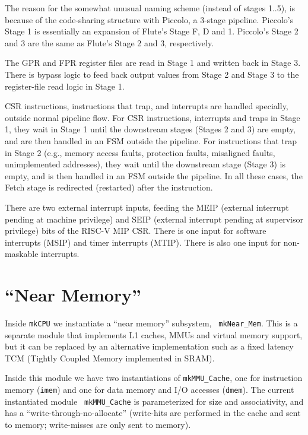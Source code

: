 \documentclass[11pt]{book}
\newcommand{\cf}{\footnotesize\tt}
\begin{document}
The reason for the somewhat unusual naming scheme (instead of stages
1..5), is because of the code-sharing structure with Piccolo, a
3-stage pipeline.  Piccolo's Stage 1 is essentially an expansion of
Flute's Stage F, D and 1.  Piccolo's Stage 2 and 3 are the same as
Flute's Stage 2 and 3, respectively.

The GPR and FPR register files are read in Stage 1 and written back in
Stage 3.  There is bypass logic to feed back output values from Stage
2 and Stage 3 to the register-file read logic in Stage 1.

CSR instructions, instructions that trap, and interrupts are handled
specially, outside normal pipeline flow.  For CSR instructions,
interrupts and traps in Stage 1, they wait in Stage 1 until the
downstream stages (Stages 2 and 3) are empty, and are then handled in
an FSM outside the pipeline.  For instructions that trap in Stage 2
(e.g., memory access faults, protection faults, misaligned faults,
unimplemented addresses), they wait until the downstream stage (Stage
3) is empty, and is then handled in an FSM outside the pipeline.  In
all these cases, the Fetch stage is redirected (restarted) after the
instruction.

There are two external interrupt inputs, feeding the MEIP (external
interrupt pending at machine privilege) and SEIP (external interrupt
pending at supervisor privilege) bits of the RISC-V MIP CSR.  There is
one input for software interrupts (MSIP) and timer interrupts (MTIP).
There is also one input for non-maskable interrupts.


\section{``Near Memory''}

Inside {\cf mkCPU} we instantiate a ``near memory'' subsystem, {\cf
mkNear\_Mem}.  This is a separate module that implements L1
caches, MMUs and virtual memory support, but it can be replaced by an
alternative implementation such as a fixed latency TCM (Tightly
Coupled Memory implemented in SRAM).

Inside this module we have two instantiations of {\cf mkMMU\_Cache},
one for instruction memory ({\cf imem}) and one for data memory and
I/O accesses ({\cf dmem}).  The current instantiated module {\cf
mkMMU\_Cache} is parameterized for size and associativity, and has a
``write-through-no-allocate'' (write-hits are performed in the cache
and sent to memory; write-misses are only sent to memory).
\end{document}
